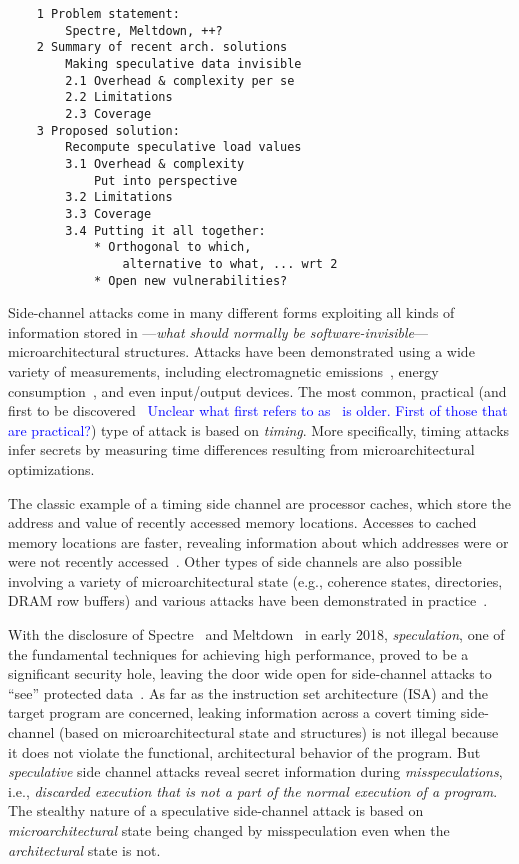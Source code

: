 \begin{verbatim}
    1 Problem statement: 
        Spectre, Meltdown, ++?
    2 Summary of recent arch. solutions
        Making speculative data invisible
        2.1 Overhead & complexity per se
        2.2 Limitations
        2.3 Coverage
    3 Proposed solution: 
        Recompute speculative load values
        3.1 Overhead & complexity 
            Put into perspective
        3.2 Limitations 
        3.3 Coverage
        3.4 Putting it all together:
            * Orthogonal to which, 
                alternative to what, ... wrt 2
            * Open new vulnerabilities?
\end{verbatim}


 Side-channel attacks come in many different forms exploiting all kinds of information stored in ---\emph{what should normally be software-invisible}--- microarchitectural structures. Attacks have been demonstrated using a wide variety of measurements, including electromagnetic emissions~\cite{agrawal2002side}, energy consumption~\cite{kocher1999differential}, and even input/output devices\cite{genkin2014rsa,ferrigno2008aes,carmon2017photonic}. The most common, practical (and first to be discovered~\cite{bernstein2005cache} \textcolor{blue}{Unclear what first refers to as~\cite{agrawal2002side} is older. First of those that are practical?}) type of attack is based on \emph{timing}. More specifically, timing attacks infer secrets by measuring time differences resulting from microarchitectural optimizations.

The classic example of a timing side channel are processor caches, which store the address and value of recently accessed memory locations. Accesses to cached memory locations are faster, revealing information about which addresses were or were not recently accessed~\cite{yarom_flush+_2014,liu15llc,irazoqui_cross_2016}. Other types of side channels are also possible involving a variety of microarchitectural state (e.g., coherence states, directories, DRAM row buffers) 
and various attacks have been demonstrated in practice~\cite{}.

With the disclosure of Spectre~\cite{kocher_spectre_2018} and Meltdown~\cite{lipp_meltdown_2018} in early 2018, \emph{speculation}, one of the fundamental techniques for achieving high
performance, proved to be a significant security hole, leaving the door wide
open for side-channel attacks to ``see'' protected data~\cite{kocher_spectre_2018,lipp_meltdown_2018}.
As far as the instruction set architecture (ISA) and the target program are
concerned, leaking information across a covert timing side-channel (based on microarchitectural state and structures) is not illegal
because it does not violate the functional, architectural behavior of the program.
But \emph{speculative} side channel attacks reveal secret information during \emph{misspeculations}, 
i.e., \emph{discarded execution that is not a part of the normal execution of a program}.
The stealthy nature of a speculative side-channel attack is based on
\emph{microarchitectural} state being changed by misspeculation even when the \emph{architectural}
state is not.

